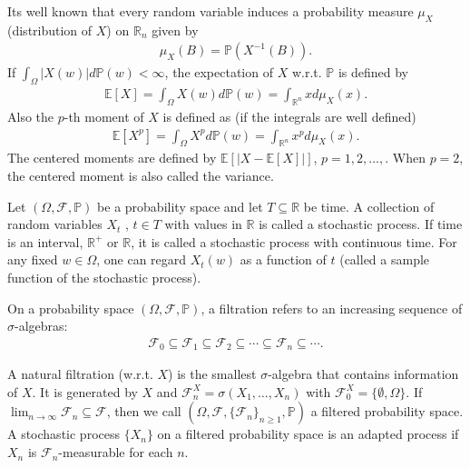 	\noindent Its well known that every random variable induces a probability measure $\mu_X$ (distribution of $X$) on $\mathbb{R}_n$ given by
	\begin{align*}
		\mu_X (B) = \mathbb{P} (X^{-1} (B)).
	\end{align*}
	If $ \int_{\Omega} | X(w) | d \mathbb{P} (w) < \infty$, the expectation of $X$ w.r.t. $\mathbb{P}$ is defined by
	\begin{align*}
		\mathbb{E} [X] = \int_{\Omega} X(w) d \mathbb{P} (w) = \int_{\mathbb{R}^n} x d \mu_X (x).
	\end{align*}  
	Also the $p$-th moment of $X$ is defined as (if the integrals are well defined)
	\begin{align*}
		\mathbb{E} [X^p] = \int_{\Omega} X^p d \mathbb{P} (w) = \int_{\mathbb{R}^n} x^p d \mu_X (x).
	\end{align*}
	The centered moments are defined by $\mathbb{E} \left[ |X - \mathbb{E}[X]| \right]$, $p = 1, 2, \dots, $. When
	$p = 2$, the centered moment is also called the variance. \\
	
	\begin{definition}
		Let $(\Omega, \mathcal{F}, \mathbb{P})$ be a probability space and let $T \subseteq \mathbb{R}$ be
		time. A collection of random variables $X_t$ , $t \in T$ with values in $\mathbb{R}$ is called a
		stochastic process. If time is an interval, $\mathbb{R}^+$ or $\mathbb{R}$, it is called a stochastic process with continuous time. For any fixed $w \in \Omega$, one can regard $X_t (w)$ as a function of
		$t$ (called a sample function of the stochastic process).
	\end{definition}

	\noindent On a probability space $(\Omega, \mathcal{F}, \mathbb{P})$, a filtration refers to an increasing sequence of $\sigma$-algebras:
	\begin{align*}
		\mathcal{F}_0 \subseteq \mathcal{F}_1 \subseteq \mathcal{F}_2 \subseteq \cdots \subseteq \mathcal{F}_n \subseteq \cdots .
	\end{align*}
	
	\noindent A natural filtration (w.r.t. $X$) is the smallest $\sigma$-algebra that contains
	information of $X$. It is generated by $X$ and $\mathcal{F}^X_n = \sigma(X_1, \dots, X_n)$ with $\mathcal{F}^X_0 = \{\emptyset, \Omega \}$. If $\lim_{n \rightarrow \infty} \mathcal{F}_n \subseteq \mathcal{F}$, then we call $(\Omega, \mathcal{F}, \{ \mathcal{F}_n \}_{n \geq 1}, \mathbb{P})$ a filtered probability space. A stochastic process $\{X_n \}$ on a filtered probability space is an adapted process if $X_n$ is $\mathcal{F}_n$-measurable for each $n$.
	
